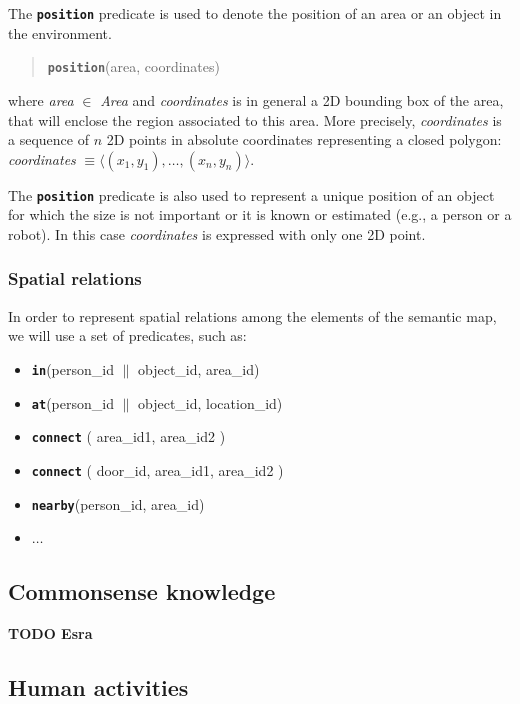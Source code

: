 \documentclass{article}
\begin{document}
The {\tt\bf position} predicate is used to denote the position of an area or an object in the environment.

\begin{quote}
{\tt\bf position}(area, coordinates)
\end{quote}

\noindent
where \emph{area} $\in$ \emph{Area} and \emph{coordinates} is in general a 2D bounding box of the area, that will enclose the region associated to this area. More precisely, \emph{coordinates} is a sequence of $n$ 2D points in absolute coordinates representing a closed polygon: \emph{coordinates} $\equiv \langle (x_1, y_1) , \ldots, (x_n, y_n) \rangle$.

The {\tt\bf position} predicate is also used to represent a unique position of an object for which the size is not important or it is known or estimated (e.g., a person or a robot). In this case \emph{coordinates} is expressed with only one 2D point. 


\subsubsection{Spatial relations}

In order to represent spatial relations among the elements of the semantic map, we will use a set of predicates, such as:

\begin{itemize}
\item {\tt\bf in}(person\_id $\|$ object\_id, area\_id)
\item {\tt\bf at}(person\_id $\|$ object\_id, location\_id)
\item {\bf\tt connect} ( area\_id1, area\_id2 )
\item {\bf\tt connect} ( door\_id, area\_id1, area\_id2 )
\item {\tt\bf nearby}(person\_id, area\_id)
\item $\ldots$
\end{itemize}




\subsection{Commonsense knowledge}

{\bf TODO Esra}

\vspace{3cm}



\subsection{Human activities}
\end{document}
